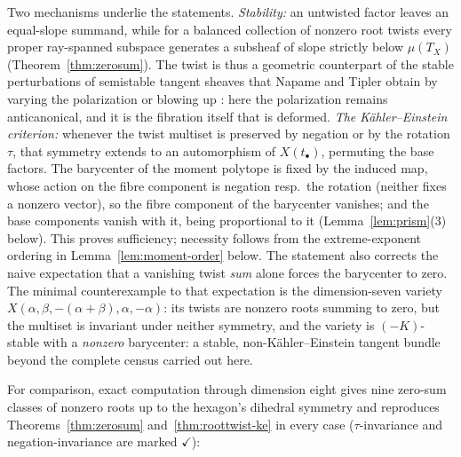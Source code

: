 \documentclass[11pt]{amsart}
\theoremstyle{definition}
\theoremstyle{remark}
\begin{document}
Two mechanisms underlie the statements. \emph{Stability:} an untwisted factor
leaves an equal-slope summand, while for a balanced collection of nonzero root
twists every proper ray-spanned subspace generates a subsheaf of slope
strictly below $\mu(T_X)$ (Theorem~\ref{thm:zerosum}). The twist is thus a geometric counterpart of the stable
perturbations of semistable tangent sheaves that Napame and Tipler
obtain by varying the polarization or blowing up
\cite{NapameTipler2024}: here the polarization remains anticanonical,
and it is the fibration itself that is deformed.
\emph{The K\"ahler--Einstein criterion:} whenever the twist multiset is
preserved by negation or by the rotation $\tau$, that symmetry extends to
an automorphism of $X(t_\bullet)$, permuting the base factors. The
barycenter of the moment polytope is fixed by the induced map, whose
action on the fibre component is negation resp.\ the rotation (neither
fixes a nonzero vector), so the fibre component of the barycenter
vanishes; and the base components vanish with it, being proportional to it
(Lemma~\ref{lem:prism}(3) below). This proves sufficiency; necessity follows
from the extreme-exponent ordering in Lemma~\ref{lem:moment-order} below.
The statement also
corrects the naive expectation that a
vanishing twist \emph{sum} alone forces the barycenter to zero. The minimal
counterexample to that expectation is the dimension-seven variety
$X(\alpha,\beta,-(\alpha+\beta),\alpha,-\alpha)$: its twists are nonzero
roots summing to zero, but the multiset is invariant under neither symmetry,
and the variety is $(-K)$-stable with a \emph{nonzero} barycenter: a
stable, non-K\"ahler--Einstein tangent bundle beyond the complete census
carried out here.

For comparison, exact computation through dimension eight gives nine
zero-sum classes of nonzero roots up to the hexagon's dihedral symmetry and
reproduces Theorems~\ref{thm:zerosum} and~\ref{thm:roottwist-ke} in every
case ($\tau$-invariance and negation-invariance are marked $\checkmark$):
\end{document}
